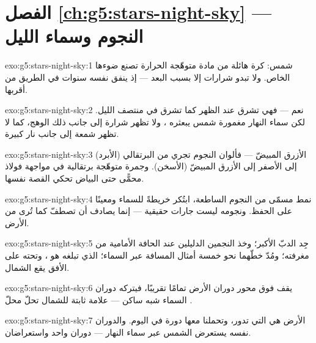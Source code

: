 \section*{الفصل \ref{ch:g5:stars-night-sky} --- النجوم وسماء الليل}

\begin{solution}{exo:g5:stars-night-sky:1}
 شمس: كرة هائلة من مادة متوهّجة الحرارة تصنع ضوءها الخاص.
ولا تبدو شرارات إلا بسبب البعد --- إذ ينفق  نفسه سنوات في
الطريق من أقربها.
\end{solution}

\begin{solution}{exo:g5:stars-night-sky:2}
نعم --- فهي تشرق عند الظهر كما تشرق في منتصف الليل. لكن سماء
النهار مغمورة  شمس يبعثره ، ولا تظهر شرارة إلى جانب
ذلك الوهج، كما لا تظهر شمعة إلى جانب نار كبيرة.
\end{solution}

\begin{solution}{exo:g5:stars-night-sky:3}
الأزرق المبيضّ --- فألوان النجوم تجري من البرتقالي (الأبرد) إلى
الأصفر إلى الأزرق المبيضّ (الأسخن). وجمرة متوهّجة برتقالية في
مواجهة فولاذ محمًّى حتى البياض تحكي القصة نفسها.
\end{solution}

\begin{solution}{exo:g5:stars-night-sky:4}
نمط مسمّى من النجوم الساطعة، ابتُكر خريطةً للسماء ومعينًا على
الحفظ. ونجومه ليست جارات حقيقية --- إنما يصادف أن تصطفّ كما
تُرى من الأرض.
\end{solution}

\begin{solution}{exo:g5:stars-night-sky:5}
جِد الدبّ الأكبر؛ وخذ النجمين الدليلين عند الحافة الأمامية من
مغرفته؛ ومُدّ خطّهما نحو خمسة أمثال المسافة عبر السماء؛ 
الذي تبلغه هو ، وتحته على الأفق يقع الشمال.
\end{solution}

\begin{solution}{exo:g5:stars-night-sky:6}
يقف فوق محور دوران الأرض تمامًا تقريبًا، فيتركه دوران السماء
شبه ساكن --- علامة ثابتة للشمال تحلّ محلّ .
\end{solution}

\begin{solution}{exo:g5:stars-night-sky:7}
الأرض هي التي تدور، وتحملنا معها دورة في اليوم. والدوران نفسه
يستعرض الشمس عبر سماء النهار --- دوران واحد واستعراضان.
\end{solution}


